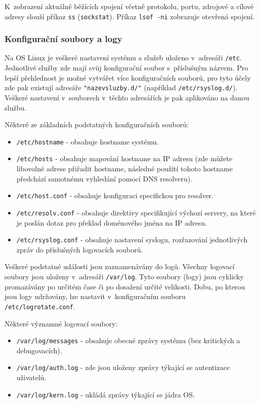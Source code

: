 K~zobrazení aktuálně běžících spojení včetně protokolu, portu, zdrojové a cílové
adresy slouží příkaz \texttt{ss} (\texttt{sockstat}). Příkaz \texttt{lsof -ni}
zobrazuje otevřená spojení.

\subsubsection{Konfigurační soubory a logy}
Na OS Linux je veškeré nastavení systému a služeb uloženo v~adresáři \texttt{/etc}. Jednotlivé služby zde mají svůj konfigurační soubor s~příslušným názvem. Pro lepší přehlednost je možné vytvářet více konfiguračních souborů, pro tyto účely zde pak existují adresáře \texttt{"nazevsluzby.d/"} (například \texttt{/etc/rsyslog.d/}). Veškeré nastavení v~souborech v~těchto adresářích je pak aplikováno na danou službu.

Některé ze základních podstatných konfiguračních souborů:
\begin{itemize}
				\item \texttt{/etc/hostname} - obsahuje hostname systému.
				\item \texttt{/etc/hosts} - obsahuje mapování hostname na IP adresu (zde můžete libovolné adrese přiřadit hostname, následné použití tohoto hostname předchází samotnému vyhledání pomocí DNS resolveru).
				\item \texttt{/etc/host.conf} - obsahuje konfiguraci specifickou pro resolver.
				\item \texttt{/etc/resolv.conf} - obsahuje direktivy specifikující výchozí servery, na které je poslán dotaz pro překlad doménového jména na IP adresu.
				\item \texttt{/etc/rsyslog.conf} - obsahuje nastavení syslogu, rozřazování jednotlivých zpráv do příslušných logovacích souborů.
\end{itemize}


Veškeré podstatné události jsou zaznamenávány do logů. Všechny logovací soubory jsou uloženy v~adresáři \texttt{/var/log}. Tyto soubory (logy) jsou cyklicky promazávány po určitém čase či po dosažení určité velikosti. Dobu, po kterou jsou logy udržovány, lze nastavit v~konfiguračním souboru\\\texttt{/etc/logrotate.conf}.

Některé významné logovací soubory:
\begin{itemize}
				\item \texttt{/var/log/messages} - obsahuje obecné zprávy systému (bez kritických a debugovacích).
				\item \texttt{/var/log/auth.log} - zde jsou uloženy zprávy týkající se autentizace uživatelů.
				\item \texttt{/var/log/kern.log} - ukládá zprávy týkající se jádra OS.
\end{itemize}


